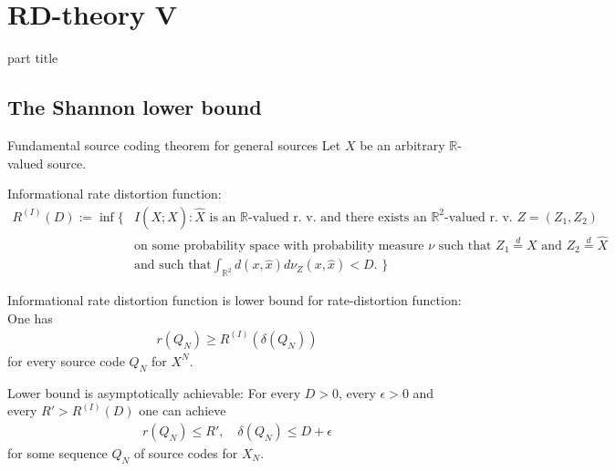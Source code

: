 
\DeclareMathOperator{\cwd}{codeword}
\newtheorem{proposition}{Proposition}
\usepackage{forest}
\usepackage{lipsum}
\usepackage{subcaption}
\usepackage{mathtools}


\section{RD-theory V} 
\begin{frame}
 \vspace{12.0ex}
\begin{center}
\begin{beamercolorbox}[sep=12pt,center]{part title}
\insertsection\par
\end{beamercolorbox}
\end{center}
\end{frame}


\subsection{The Shannon lower bound}
\begin{frame}{Fundamental source coding theorem for general sources}
Let $X$ be an arbitrary $\mathbb{R}$-valued source. 
\bit
\item Informational rate distortion function: 
\begin{align*}
R^{(I)}(D):=\inf\bigl\{&I(X;\hat{X})\colon  \text{$\hat{X}$ is an $\mathbb{R}$-valued r. v.  and there exists an $\mathbb{R}^2$-valued r. v. $Z=(Z_1,Z_2)$}\\ &\text{on some probability space with probability measure $\nu$ such that $Z_1\stackrel{d}{=} X$ and $Z_2\stackrel{d}{=} \hat{X}$} \\ &\text{and such that
$\int_{\mathbb{R}^2}d(x,\hat{x})d\nu_Z(x,\hat{x})<D$. }
\bigr\}
\end{align*} 
\item Informational rate distortion function is lower bound for rate-distortion function: One has
\begin{align*}
r(Q_N)\geq R^{(I)}(\delta(Q_N))
\end{align*}
for every source code $Q_N$ for $X^N$.  
\item Lower bound is asymptotically achievable: For every $D>0$, every $\epsilon>0$ and every $R'>R^{(I)}(D)$ one can achieve
\begin{align*}
r(Q_N)\leq R',\quad \delta(Q_N)\leq D+\epsilon 
\end{align*}
for some sequence $Q_N$ of source codes for $X_N$. 
\eit
\end{frame}

